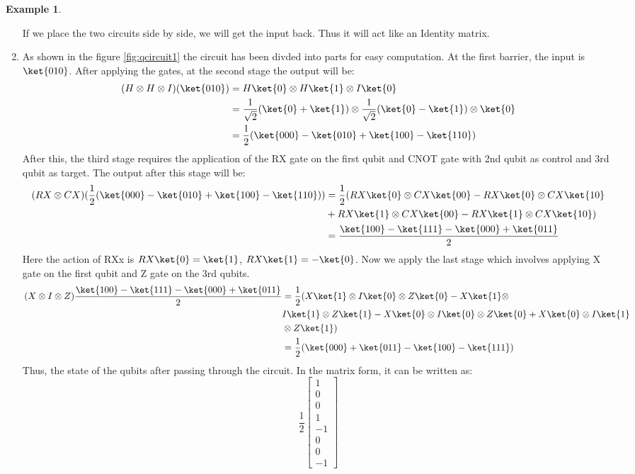 \documentclass[12pt, oneside]{book}
\theoremstyle{definition}
\theoremstyle{definition}
\newtheorem{example}{Example}[section]
\theoremstyle{remark}
\begin{document}
\begin{example}
\begin{enumerate}
\begin{figure}[H]
        \end{figure}
        If we place the two circuits side by side, we will get the input back. Thus it will act like an Identity matrix.
        \item As shown in the figure \ref{fig:qcircuit1} the circuit has been divded into parts for easy computation. At the first barrier, the input is $\ket{010}$.
        After applying the gates, at the second stage the output will be:
        \begin{align*}
            (H \otimes H \otimes I)(\ket{010})&=H\ket{0} \otimes H\ket{1}\otimes I\ket{0}\\
            &=\frac{1}{\sqrt{2}}(\ket{0}+\ket{1})\otimes\frac{1}{\sqrt{2}}(\ket{0}-\ket{1})\otimes\ket{0}\\
            &=\frac{1}{2}(\ket{000}-\ket{010}+\ket{100}-\ket{110})
        \end{align*}
        After this, the third stage requires the application of the RX gate on the first qubit and CNOT gate with 2nd qubit as control and 3rd qubit as target.
        The output after this stage will be:
        \begin{align*}
            (RX \otimes CX)(\frac{1}{2}(\ket{000}-\ket{010}+\ket{100}-\ket{110}))&=\frac{1}{2}(RX\ket{0} \otimes CX\ket{00}-RX\ket{0} \otimes CX\ket{10}\\
            &+RX\ket{1}\otimes CX\ket{00}-RX\ket{1}\otimes CX\ket{10})\\
            &=\frac{\ket{100}-\ket{111}-\ket{000}+\ket{011}}{2}
        \end{align*}
        Here the action of RXx is $RX\ket{0}=\ket{1}$, $RX\ket{1}=-\ket{0}$.
        Now we apply the last stage which involves applying X gate on the first qubit and Z gate on the 3rd qubits.
        \begin{align*} 
            (X \otimes I \otimes Z)\frac{\ket{100}-\ket{111}-\ket{000}+\ket{011}}{2}&=\frac{1}{2}(X\ket{1} \otimes I\ket{0} \otimes Z\ket{0}-X\ket{1}\otimes \\
            & I\ket{1}\otimes Z\ket{1}-X\ket{0}\otimes I\ket{0}\otimes Z\ket{0}+X\ket{0}\otimes I\ket{1}\\
            &\otimes Z\ket{1})\\
            &=\frac{1}{2}(\ket{000}+\ket{011}-\ket{100}-\ket{111})
        \end{align*}
        Thus, the state of the qubits after passing through the circuit.
        In the matrix form, it can be written as:
        \[
            \frac{1}{2}\begin{bmatrix} 1 \\ 0 \\ 0 \\ 1 \\ -1 \\ 0 \\ 0 \\-1 \end{bmatrix}
\]
\end{enumerate}
\end{example}
\end{document}

